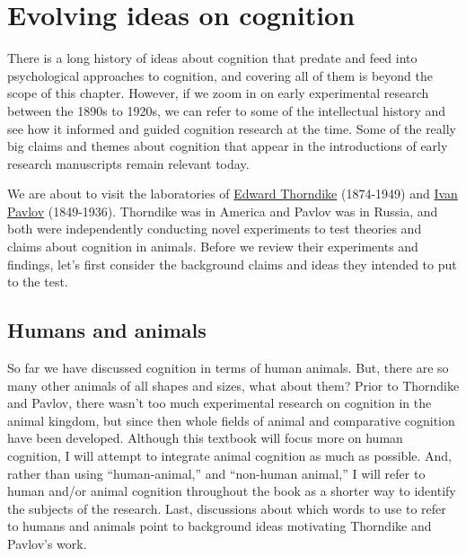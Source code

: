 \documentclass[
  oneside,
  12pt]{crumpbook}
\begin{document}
\hypertarget{evolving-ideas-on-cognition}{%
\section{Evolving ideas on cognition}\label{evolving-ideas-on-cognition}}

There is a long history of ideas about cognition that predate and feed into psychological approaches to cognition, and covering all of them is beyond the scope of this chapter. However, if we zoom in on early experimental research between the 1890s to 1920s, we can refer to some of the intellectual history and see how it informed and guided cognition research at the time. Some of the really big claims and themes about cognition that appear in the introductions of early research manuscripts remain relevant today.

We are about to visit the laboratories of \href{https://en.wikipedia.org/wiki/Edward_Thorndike}{Edward Thorndike} (1874-1949) and \href{https://en.wikipedia.org/wiki/Ivan_Pavlov}{Ivan Pavlov} (1849-1936). Thorndike was in America and Pavlov was in Russia, and both were independently conducting novel experiments to test theories and claims about cognition in animals. Before we review their experiments and findings, let's first consider the background claims and ideas they intended to put to the test.

\hypertarget{humans-and-animals}{%
\subsection{Humans and animals}\label{humans-and-animals}}

So far we have discussed cognition in terms of human animals. But, there are so many other animals of all shapes and sizes, what about them? Prior to Thorndike and Pavlov, there wasn't too much experimental research on cognition in the animal kingdom, but since then whole fields of animal and comparative cognition have been developed. Although this textbook will focus more on human cognition, I will attempt to integrate animal cognition as much as possible. And, rather than using ``human-animal,'' and ``non-human animal,'' I will refer to human and/or animal cognition throughout the book as a shorter way to identify the subjects of the research. Last, discussions about which words to use to refer to humans and animals point to background ideas motivating Thorndike and Pavlov's work.
\end{document}
